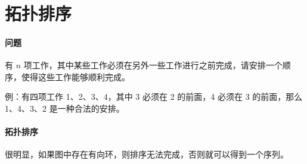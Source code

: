 \section{拓扑排序}
	\paragraph{问题} 有 $n$ 项工作，其中某些工作必须在另外一些工作进行之前完成，请安排一个顺序，使得这些工作能够顺利完成。
	
	例：有四项工作 1、2、3、4，其中 3 必须在 2 的前面，4 必须在 3 的前面，那么 1、4、3、2 是一种合法的安排。
	
	\paragraph{拓扑排序} 很明显，如果图中存在有向环，则排序无法完成，否则就可以得到一个序列。

    
    
    

